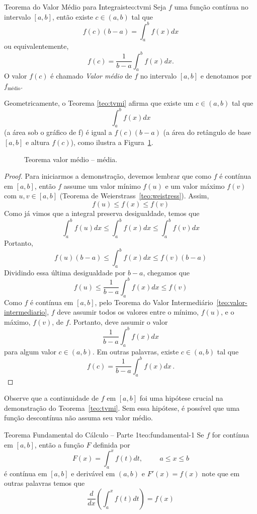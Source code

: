\begin{teorema}{Teorema do Valor Médio para Integrais}{teo:tvmi}
  Seja $f$ uma função contínua no intervalo $[a, b]$, então existe $c \in (a, b)$
  tal que
  \[
      f(c)(b-a)= \int_a^b f(x)dx
  \]
  ou equivalentemente,
  \[
      f(c)= \frac{1}{b-a}\int_a^b f(x)dx.
  \]
  O valor $f(c)$ é chamado \textit{Valor médio} de $f$ no intervalo $[a, b]$
  e denotamos por $f_{\text{médio}}$.
\end{teorema}

Geometricamente, o Teorema \ref{teo:tvmi} afirma que existe um $c \in (a, b)$
tal que
\[
  \int_a^bf(x) dx
\]
(a área sob o gráfico de f) é igual a
$f(c) (b-a)$ (a área do retângulo de base $[a, b]$ e altura $f(c)$),
como ilustra a Figura~\ref{fig:valormedio_media}.

\begin{figure}
   \centering
   
   \caption{Teorema valor médio -- média.}
   \label{fig:valormedio_media}
\end{figure}

\begin{proof}
  Para iniciarmos a demonstração, devemos lembrar que como $f$ é contínua em
  $[a, b]$, então $f$ assume um
  valor mínimo $f(u)$ e um
  valor máximo $f(v)$ com $u, v \in [a, b]$
  (Teorema de Weierstrass~\ref{teo:weistress}).
  Assim,
  \[
    f(u) \leq f(x) \leq f(v)
  \]
  Como já vimos que a integral preserva desigualdade, temos que
  \[
    \int_a^b f(u) dx \leq \int_a^b f(x) dx\leq \int_a^b f(v) dx
  \]
  Portanto,
  \[
    f(u)(b-a) \leq \int_a^b f(x) dx \leq f(v)(b-a)
  \]
  Dividindo essa última desigualdade por $b-a$, chegamos que
  \[
    f(u) \leq \frac{1}{b-a}\int_a^b f(x)dx \leq f(v)
  \]
  Como $f$ é contínua em $[a, b]$, pelo Teorema do Valor
  Intermediário~\ref{teo:valor-intermediario}, $f$ deve assumir
  todos os valores entre o mínimo, $f(u)$, e o máximo, $f(v)$,
  de $f$. Portanto, deve assumir o valor
  \[
    \frac{1}{b-a}\int_a^b f(x)dx
  \]
  para algum valor $c \in (a, b)$. Em outras palavras, existe
  $c \in (a, b)$ tal que
  \[
    f(c)= \frac{1}{b-a}\int_a^b f(x)dx \,.
  \]
\end{proof}

Observe que a continuidade de $f$ em $[a, b]$ foi uma hipótese crucial na
demonstração do Teorema~\ref{teo:tvmi}. Sem essa hipótese, é possível que
uma função descontínua não assuma seu valor médio.

\begin{teorema}{Teorema Fundamental do Cálculo -- Parte 1}{teo:fundamental-1}
  Se $f$ for contínua em $[a, b]$, então a função $F$ definida por
  \[
    F(x)= \int_a^x f(t)dt, \hspace{1cm} a \leq x \leq b
  \]
  é contínua em $[a, b]$ e derivável em $(a, b)$ e $F'(x)=f(x)$
  note que em outras palavras temos que
  \[
    \frac{d}{dx} \left( \int_a^x f(t)dt \right)=f(x)
  \]
\end{teorema}

